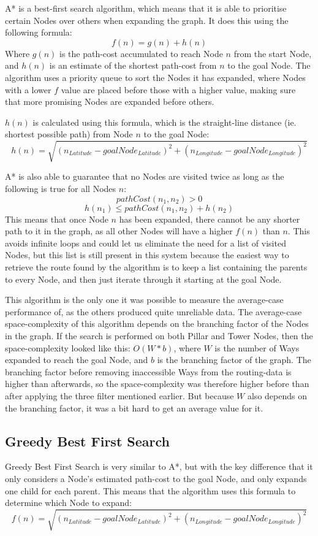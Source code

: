 A* is a best-first search algorithm, which means that it is able to prioritise certain Nodes over others when expanding the graph. It does this using the following formula:
$$f(n)=g(n)+h(n)$$
Where $g(n)$ is the path-cost accumulated to reach Node $n$ from the start Node, and $h(n)$ is an estimate of the shortest path-cost from $n$ to the goal Node. The algorithm uses a priority queue to sort the Nodes it has expanded, where Nodes with a lower $f$ value are placed before those with a higher value, making sure that more promising Nodes are expanded before others.

$h(n)$ is calculated using this formula, which is the straight-line distance (ie. shortest possible path) from Node $n$ to the goal Node:
$$h(n)=\sqrt{(n_{Latitude}-goalNode_{Latitude})^2+(n_{Longitude}-goalNode_{Longitude})^2}$$

A* is also able to guarantee that no Nodes are visited twice as long as the following is true for all Nodes $n$:
$$pathCost(n_1,n_2)>0$$
$$h(n_1)\leq pathCost(n_1,n_2)+h(n_2)$$
This means that once Node $n$ has been expanded, there cannot be any shorter path to it in the graph, as all other Nodes will have a higher $f(n)$ than $n$. This avoids infinite loops and could let us eliminate the need for a list of visited Nodes, but this list is still present in this system because the easiest way to retrieve the route found by the algorithm is to keep a list containing the parents to every Node, and then just iterate through it starting at the goal Node.

This algorithm is the only one it was possible to measure the average-case performance of, as the others produced quite unreliable data. The average-case space-complexity of this algorithm depends on the branching factor of the Nodes in the graph. If the search is performed on both Pillar and Tower Nodes, then the space-complexity looked like this: $O(W*b)$, where $W$ is the number of Ways expanded to reach the goal Node, and $b$ is the branching factor of the graph. The branching factor before removing inaccessible Ways from the routing-data is higher than afterwards, so the space-complexity was therefore higher before than after applying the three filter mentioned earlier. But because $W$ also depends on the branching factor, it was a bit hard to get an average value for it.

\subsection{Greedy Best First Search}
Greedy Best First Search is very similar to A*, but with the key difference that it only considers a Node's estimated path-cost to the goal Node, and only expands one child for each parent.
This means that the algorithm uses this formula to determine which Node to expand:
$$f(n)=\sqrt{(n_{Latitude}-goalNode_{Latitude})^2+(n_{Longitude}-goalNode_{Longitude})^2}$$


